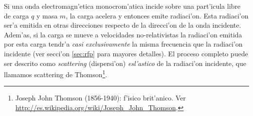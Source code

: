 
Si una onda electromagn'etica monocrom'atica incide
sobre una part'icula libre de carga $q$ y masa $m$, la carga acelera y
entonces emite radiaci'on. Esta radiaci'on ser'a emitida en otras
direcciones respecto de la direcci'on de la onda incidente. Adem'as, si la carga se mueve a velocidades no-relativistas la radiaci'on emitida por esta carga tendr'a \textit{casi exclusivamente} la misma frecuencia que la radiaci'on incidente (ver secci'on \ref{sec:rfp} para mayores detalles). El proceso completo puede ser descrito como \textit{scattering} (dispersi'on) \textit{esl'astico} de la radiaci'on incidente, que llamamos scattering de Thomson\footnote{Joseph John Thomson (1856-1940): f'isico brit'anico. Ver \url{http://es.wikipedia.org/wiki/Joseph_John_Thomson}.}.

